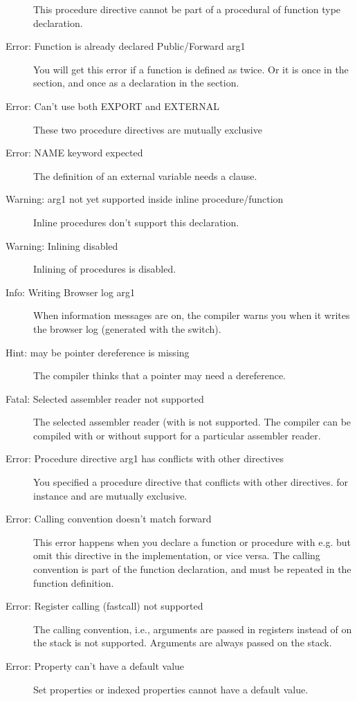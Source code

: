 \begin{description}
 This procedure directive cannot be part of a procedural of function
 type declaration.
\item [Error: Function is already declared Public/Forward arg1]
 You will get this error if a function is defined as  twice.
 Or it is once in the  section, and once as a 
 declaration in the  section.
\item [Error: Can't use both EXPORT and EXTERNAL]
 These two procedure directives are mutually exclusive
\item [Error: NAME keyword expected]
 The definition of an external variable needs a  clause.
\item [Warning: arg1 not yet supported inside inline procedure/function]
 Inline procedures don't support this declaration.
\item [Warning: Inlining disabled]
 Inlining of procedures is disabled.
\item [Info: Writing Browser log arg1]
 When information messages are on, the compiler warns you when it
 writes the browser log (generated with the  switch).
\item [Hint: may be pointer dereference is missing]
 The compiler thinks that a pointer may need a dereference.
\item [Fatal: Selected assembler reader not supported]
 The selected assembler reader (with  is not
 supported. The compiler can be compiled with or without support for a
 particular assembler reader.
\item [Error: Procedure directive arg1 has conflicts with other directives]
 You specified a procedure directive that conflicts with other directives.
 for instance  and  are mutually exclusive.
\item [Error: Calling convention doesn't match forward]
 This error happens when you declare a function or procedure with
 e.g.  but omit this directive in the implementation, or vice
 versa. The calling convention is part of the function declaration, and
 must be repeated in the function definition.
\item [Error: Register calling (fastcall) not supported]
 The  calling convention, i.e., arguments are passed in
 registers instead of on the stack is not supported. Arguments are always
 passed on the stack.
\item [Error: Property can't have a default value]
 Set properties or indexed properties cannot have a default value.

\end{description}
